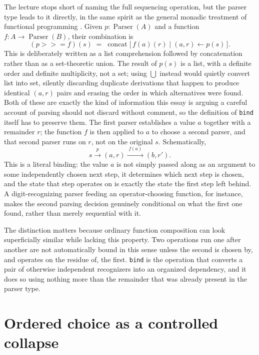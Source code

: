 \documentclass[11pt]{article}
\begin{document}
The lecture stops short of naming the full sequencing operation, but the parser type leads to it directly, in the same spirit as the general monadic treatment of functional programming \cite{wadler-1992,wadler-1995}. Given $p : \operatorname{Parser}(A)$ and a function $f : A \to \operatorname{Parser}(B)$, their combination is
\[
(p \mathbin{>\!\!>\!\!=} f)(s) \;=\; \operatorname{concat}\bigl[\, f(a)(r) \mid (a,r) \leftarrow p(s) \,\bigr].
\]
This is deliberately written as a list comprehension followed by concatenation rather than as a set-theoretic union. The result of $p(s)$ is a list, with a definite order and definite multiplicity, not a set; using $\bigcup$ instead would quietly convert list into set, silently discarding duplicate derivations that happen to produce identical $(a,r)$ pairs and erasing the order in which alternatives were found. Both of these are exactly the kind of information this essay is arguing a careful account of parsing should not discard without comment, so the definition of \texttt{bind} itself has to preserve them. The first parser establishes a value $a$ together with a remainder $r$; the function $f$ is then applied to $a$ to choose a second parser, and that second parser runs on $r$, not on the original $s$. Schematically,
\[
s \xrightarrow{\;p\;} (a, r) \xrightarrow{\;f(a)\;} (b, r').
\]
This is a literal binding: the value $a$ is not simply passed along as an argument to some independently chosen next step, it determines which next step is chosen, and the state that step operates on is exactly the state the first step left behind. A digit-recognizing parser feeding an operator-choosing function, for instance, makes the second parsing decision genuinely conditional on what the first one found, rather than merely sequential with it.

The distinction matters because ordinary function composition can look superficially similar while lacking this property. Two operations run one after another are not automatically bound in this sense unless the second is chosen by, and operates on the residue of, the first. \texttt{bind} is the operation that converts a pair of otherwise independent recognizers into an organized dependency, and it does so using nothing more than the remainder that was already present in the parser type.

\section{Ordered choice as a controlled collapse}
\end{document}
